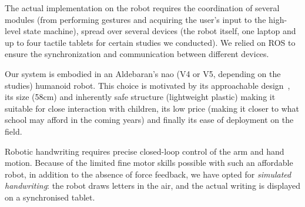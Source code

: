 \documentclass[conference]{IEEEtran}
\begin{document}
The actual implementation on the robot requires the coordination of
several modules (from performing gestures and acquiring the user's input to
the high-level state machine), spread over several devices (the robot itself,
one laptop and up to four tactile tablets for certain studies we conducted). We
relied on ROS to ensure the synchronization and communication between different devices.

Our system is embodied in an Aldebaran's {\sc nao} (V4 or V5, depending on the
studies) humanoid robot. This choice is motivated by its approachable
design~\cite{Gouaillier2008}, its size (58cm) and inherently safe structure
(lightweight plastic) making it suitable for close interaction with children,
its low price (making it closer to what school may afford in the coming years)
and finally its ease of deployment on the field.

Robotic handwriting requires precise closed-loop control of the arm and hand
motion. Because of the limited fine motor skills possible with such an
affordable robot, in addition to the absence of force feedback, we have opted
for \emph{simulated handwriting}: the robot draws letters in the air, and the
actual writing is displayed on a synchronised tablet.
\end{document}

